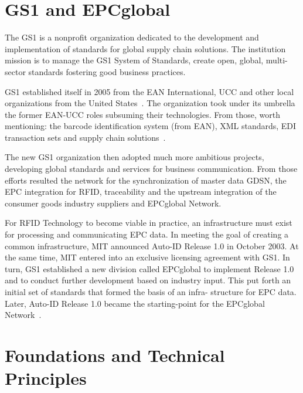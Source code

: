 \section{GS1 and EPCglobal}

The GS1 is a nonprofit organization dedicated to the development and implementation of standards for global \gls{supply chain} solutions. 
The institution mission is to manage the GS1 System of Standards, create open, global, multi-sector standards fostering good business practices.

GS1 established itself in 2005 from the \gls{EAN} International, \gls{UCC} and other local organizations from the United States~\cite{PublicationLEBENSMITTELZEITUNGa}.
The organization took under its umbrella the former EAN-UCC roles subsuming their technologies. From those, worth mentioning: the barcode identification system (from \gls{EAN}), \gls{XML} standards, \gls{EDI} transaction sets and \gls{supply chain} solutions~\cite[p.~212]{lahiriRFIDSourcebook2005}.

The new GS1 organization then adopted much more ambitious projects, developing global standards and services for business communication.
From those efforts resulted the network for the synchronization of master data \gls{GDSN}, the \gls{EPC} integration for \gls{RFID}, traceability and the upstream integration of the consumer goods industry suppliers and EPCglobal Network.

For RFID Technology to become viable in practice, an infrastructure must exist for processing and communicating EPC data. In meeting the goal of creating a common infrastructure, MIT announced Auto-ID Release 1.0 in October 2003. At the same time, MIT entered into an exclusive licensing agreement with GS1.
In turn, GS1 established a new division called EPCglobal to implement Release 1.0 and to conduct further development based on industry input. This put forth an initial set of standards that formed the basis of an infra- structure for EPC data. Later, Auto-ID Release 1.0 became the starting-point for the EPCglobal Network~\cite[p. 50]{GlobalRFIDValue}. 


\section{Foundations and Technical Principles}


